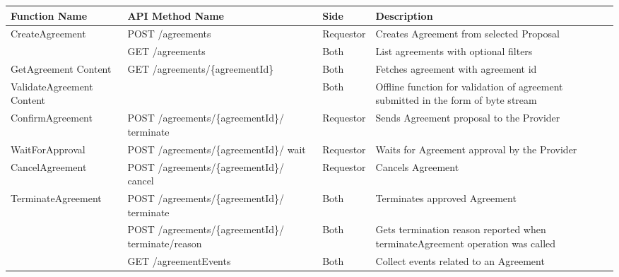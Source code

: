 \begin{enumerate}
\begin{enumerate}
\begin{table}
\begin{center}
\begin{tabular}{|p{3cm}|p{7cm}|p{1.5cm}|p{4cm}|} 
\hline
\rowcolor{lightgray}	Function Name	& API Method Name							& 	Side	&	Description \\
\hline

CreateAgreement		&	POST /agreements											& Requestor	&	Creates Agreement from selected Proposal \\
\hline

					&	GET /agreements												&	Both	&	List agreements with optional filters \\
\hline

GetAgreement \newline Content	&	GET /agreements/\{agreementId\}					&	Both	&	Fetches  agreement with agreement id \\
\hline

ValidateAgreement \newline Content &												&	Both	&	Offline function for validation of agreement submitted in the form of byte stream \\
\hline

ConfirmAgreement	& POST /agreements/\{agreementId\}/ \newline terminate			& Requestor & 	Sends Agreement proposal to the Provider \\
\hline

WaitForApproval		& POST /agreements/\{agreementId\}/ \newline wait				& Requestor & 	Waits for Agreement approval by the Provider \\
\hline

CancelAgreement		& POST /agreements/\{agreementId\}/ \newline cancel				& Requestor &	Cancels Agreement	\\
\hline

TerminateAgreement	& POST /agreements/\{agreementId\}/ \newline terminate			& Both		&	Terminates approved Agreement \\
\hline

					& POST /agreements/\{agreementId\}/ \newline terminate/reason 	& Both 		& 	Gets termination reason reported when terminateAgreement operation was called \\
\hline					

					& GET /agreementEvents											& Both 		& 	Collect events related to an Agreement \\
\hline


\end{tabular}
\end{center}
\end{table}
\end{enumerate}
\end{enumerate}
